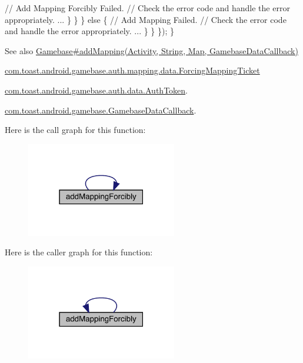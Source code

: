 \begin{DoxyCode}
                        \textcolor{comment}{// Add Mapping Forcibly Failed.}
                        \textcolor{comment}{// Check the error code and handle the error appropriately.}
                        ...
                    \}
                \}
            \} else \{
                \textcolor{comment}{// Add Mapping Failed.}
                \textcolor{comment}{// Check the error code and handle the error appropriately.}
                ...
            \}
        \}
    \});
\}
\end{DoxyCode}


\begin{DoxySeeAlso}{See also}
\hyperlink{}{Gamebase\#add\+Mapping(\+Activity, String, Map, Gamebase\+Data\+Callback)} 

\hyperlink{classcom_1_1toast_1_1android_1_1gamebase_1_1auth_1_1mapping_1_1data_1_1_forcing_mapping_ticket}{com.\+toast.\+android.\+gamebase.\+auth.\+mapping.\+data.\+Forcing\+Mapping\+Ticket} 

\hyperlink{classcom_1_1toast_1_1android_1_1gamebase_1_1auth_1_1data_1_1_auth_token}{com.\+toast.\+android.\+gamebase.\+auth.\+data.\+Auth\+Token}. 

\hyperlink{interfacecom_1_1toast_1_1android_1_1gamebase_1_1_gamebase_data_callback}{com.\+toast.\+android.\+gamebase.\+Gamebase\+Data\+Callback}. 
\end{DoxySeeAlso}
Here is the call graph for this function\+:
\nopagebreak
\begin{figure}[H]
\begin{center}
\leavevmode
\includegraphics[width=186pt]{classcom_1_1toast_1_1android_1_1gamebase_1_1_gamebase_a06dbc31c4c9e171737dee6403837b923_cgraph}
\end{center}
\end{figure}
Here is the caller graph for this function\+:
\nopagebreak
\begin{figure}[H]
\begin{center}
\leavevmode
\includegraphics[width=186pt]{classcom_1_1toast_1_1android_1_1gamebase_1_1_gamebase_a06dbc31c4c9e171737dee6403837b923_icgraph}
\end{center}
\end{figure}
